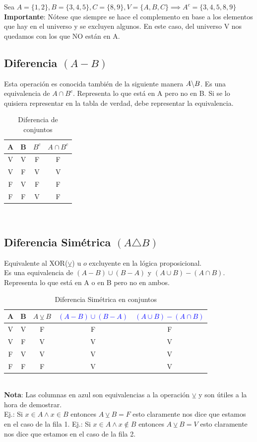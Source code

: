 \documentclass[10pt,a4paper]{article}
\begin{document}
Sea $A=\{1, 2\}, B=\{3, 4, 5\}, C=\{8, 9\}, V=\{A, B, C\} \implies A^{c} = \{3, 4, 5, 8, 9\}$ \\
\textbf{Importante}: Nótese que siempre se hace el complemento en base a los elementos que hay en el universo y se excluyen algunos. En este caso, del universo V nos quedamos con los que NO están en A.
\newpage
\subsection*{Diferencia $(A-B )$}
Esta operación es conocida también de la siguiente manera $A\symbol{92}B$.
Es una equivalencia de $A \cap B^{c}$. Representa lo que está en A pero no en B. Si se lo quisiera representar en la tabla de verdad, debe representar la equivalencia.
\begin{table}[h!]
    \centering
    \begin{tabular}{|c | c | c | c|}
    \hline
    \textbf{A} & \textbf{B} & \textbf{$B^{c}$} & \textbf{$A \cap B^{c}$} \\[0.1cm]
    \hline
    V & V & F & F\\
    V & F & V & V\\
    F & V & F & F\\
    F & F & V & F\\
    \hline
    \end{tabular}
    \caption{Diferencia de conjuntos}
\end{table} \\
\subsection*{Diferencia Simétrica $(A \triangle B)$}
Equivalente al XOR($\veebar$) u $o$ excluyente en la lógica proposicional. \\
Es una equivalencia de $(A - B) \cup (B - A)$ y $(A\cup B) - (A \cap B)$. Representa lo que está en A o en B pero no en ambos. 
\begin{table}[h!]
    \centering
    \begin{tabular}{|c | c | c | c | c|}
    \hline
    \textbf{A} & \textbf{B} & \textbf{$A \veebar B$} & \textcolor{blue}{$(A - B) \cup (B - A)$} & \textcolor{blue}{$(A\cup B) - (A \cap B)$} \\[0.1cm]
    \hline
    V & V & F & F & F \\
    V & F & V & V & V \\
    F & V & V & V & V \\
    F & F & F & V & V \\
    \hline
    \end{tabular}
    \caption{Diferencia Simétrica en conjuntos}
\end{table} \\
\textbf{Nota}: Las columnas en azul son equivalencias a la operación $\veebar$ y son útiles a la hora de demostrar. \\
Ej.: Si $x \in A \land x \in B$ entonces $ A \veebar B = F$ esto claramente nos dice que estamos en el caso de la fila 1.
Ej.: Si $x \in A \land x \notin B$ entonces $ A \veebar B = V$ esto claramente nos dice que estamos en el caso de la fila 2. \\
\end{document}
